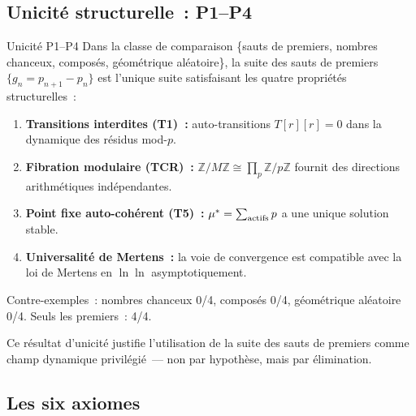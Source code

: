 \documentclass[12pt,a4paper]{article}
\begin{document}
\subsection{Unicité structurelle~: P1--P4}
\label{sec:ch9_P1P4}

\begin{thmbox}{Unicité P1--P4}
\label{thm:P1P4}
Dans la classe de comparaison \{sauts de premiers, nombres
chanceux, composés, géométrique aléatoire\}, la suite des sauts
de premiers $\{g_n = p_{n+1} - p_n\}$ est l'unique suite
satisfaisant les quatre propriétés structurelles~:
\begin{enumerate}[leftmargin=*, label=\textbf{P\arabic*.}]
\item \textbf{Transitions interdites (T1)~:} auto-transitions
  $T[r][r] = 0$ dans la dynamique des résidus mod-$p$.
\item \textbf{Fibration modulaire (TCR)~:}
  $\mathbb{Z}/M\mathbb{Z} \cong \prod_p \mathbb{Z}/p\mathbb{Z}$
  fournit des directions arithmétiques indépendantes.
\item \textbf{Point fixe auto-cohérent (T5)~:}
  ${\mu^{*}} = \sum_{\text{actifs}} p$ a une unique solution stable.
\item \textbf{Universalité de Mertens~:} la voie de convergence est
  compatible avec la loi de Mertens en $\ln\ln$ asymptotiquement.
\end{enumerate}
Contre-exemples~: nombres chanceux 0/4, composés 0/4, géométrique
aléatoire 0/4. Seuls les premiers~: 4/4.
\end{thmbox}

Ce résultat d'unicité justifie l'utilisation de la suite des sauts
de premiers comme champ dynamique privilégié~--- non par hypothèse,
mais par élimination.

\subsection{Les six axiomes}
\label{sec:ch9_axioms}
\end{document}
